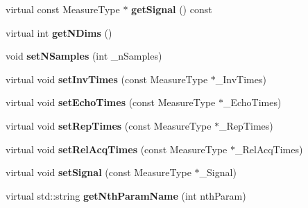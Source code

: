\begin{DoxyCompactItemize}
\item 
virtual const Measure\+Type $\ast$ {\bfseries get\+Signal} () const \hypertarget{class_ox_1_1_model_ae51878e45fa528e47a457610d857a9bb}{}\label{class_ox_1_1_model_ae51878e45fa528e47a457610d857a9bb}

\item 
virtual int {\bfseries get\+N\+Dims} ()\hypertarget{class_ox_1_1_model_af457ac73701b13fa1b3af8d800e198dc}{}\label{class_ox_1_1_model_af457ac73701b13fa1b3af8d800e198dc}

\item 
void {\bfseries set\+N\+Samples} (int \+\_\+n\+Samples)\hypertarget{class_ox_1_1_model_a9e37f6db1210b7b4a58d7ad38ba6b422}{}\label{class_ox_1_1_model_a9e37f6db1210b7b4a58d7ad38ba6b422}

\item 
virtual void {\bfseries set\+Inv\+Times} (const Measure\+Type $\ast$\+\_\+\+Inv\+Times)\hypertarget{class_ox_1_1_model_a2db9a20a6915dc41bce2deecec7c390a}{}\label{class_ox_1_1_model_a2db9a20a6915dc41bce2deecec7c390a}

\item 
virtual void {\bfseries set\+Echo\+Times} (const Measure\+Type $\ast$\+\_\+\+Echo\+Times)\hypertarget{class_ox_1_1_model_ac63fba341cfe586ec210f59fcdc0d715}{}\label{class_ox_1_1_model_ac63fba341cfe586ec210f59fcdc0d715}

\item 
virtual void {\bfseries set\+Rep\+Times} (const Measure\+Type $\ast$\+\_\+\+Rep\+Times)\hypertarget{class_ox_1_1_model_af272a398debaf156f345d85940bec556}{}\label{class_ox_1_1_model_af272a398debaf156f345d85940bec556}

\item 
virtual void {\bfseries set\+Rel\+Acq\+Times} (const Measure\+Type $\ast$\+\_\+\+Rel\+Acq\+Times)\hypertarget{class_ox_1_1_model_a534bfcec58d93c7002a6c0eb4d58ed88}{}\label{class_ox_1_1_model_a534bfcec58d93c7002a6c0eb4d58ed88}

\item 
virtual void {\bfseries set\+Signal} (const Measure\+Type $\ast$\+\_\+\+Signal)\hypertarget{class_ox_1_1_model_abb7eddc8c8c4ac94ab921158ce3a38a3}{}\label{class_ox_1_1_model_abb7eddc8c8c4ac94ab921158ce3a38a3}

\item 
virtual std\+::string {\bfseries get\+Nth\+Param\+Name} (int nth\+Param)\hypertarget{class_ox_1_1_model_a5a6b9c8c5058eb51fd2877aff917cd6d}{}\label{class_ox_1_1_model_a5a6b9c8c5058eb51fd2877aff917cd6d}


\end{DoxyCompactItemize}
